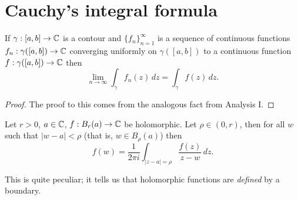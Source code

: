 \section{Cauchy's integral formula}

\begin{proposition}
    If $\gamma: [a,b] \to \mathbb{C}$ is a contour and 
    $\{f_n\}_{n = 1}^\infty$
    is a sequence of continuous functions 
    $f_n: \gamma([a,b]) \to \mathbb{C}$
    converging uniformly on $\gamma([a,b])$
    to a continuous function 
    $f: \gamma([a,b]) \to \mathbb{C}$
    then
    \[
        \lim_{n \to \infty} \int_\gamma f_n(z) \,dz
        = \int_\gamma f(z) \,dz.
    \]
\end{proposition}

\begin{proof}
    The proof to this comes from the analogous fact
    from Analysis I.
\end{proof}

\begin{theorem}
    Let $r > 0$, $a \in \mathbb{C}$, $f: B_r(a) \to \mathbb{C}$ be holomorphic.
    Let $\rho \in (0, r)$, then for all $w$ such that
    $\lvert w - a \rvert < \rho$ (that is, $w \in B_\rho(a)$) then
    \[ 
        f(w) = \frac1{2\pi i} 
        \int_{\lvert z - a \rvert = \rho} \frac{f(z)}{z - w} \,dz.
    \]
\end{theorem}

This is quite peculiar; it tells us that holomorphic functions are
\emph{defined} by a boundary.

